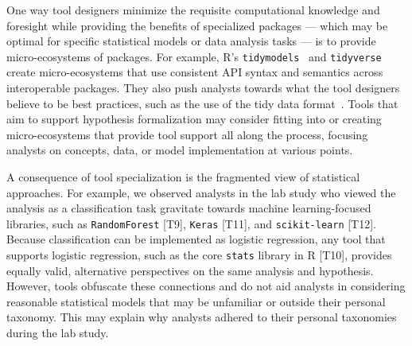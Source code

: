 
One way tool designers minimize the requisite computational knowledge and
foresight while providing the benefits of specialized packages --- which may be
optimal for specific statistical models or data analysis tasks --- is to provide
micro-ecosystems of packages. For example, R's
\texttt{tidymodels}~\cite{tidymodels} and \texttt{tidyverse}~\cite{tidyverse}
create micro-ecosystems that use consistent API syntax and semantics across
interoperable packages. They also push analysts towards what the tool designers
believe to be best practices, such as the use of the tidy data format~\cite{wickham2014tidy}. Tools
that aim to support hypothesis formalization may consider fitting into or
creating micro-ecosystems that provide tool support all along the process,
focusing analysts on concepts, data, or model implementation at various points. 

A consequence of tool specialization is the fragmented view of statistical
approaches. For example, we observed analysts in the lab study who viewed the
analysis as a classification task gravitate towards machine learning-focused
libraries, such as \texttt{RandomForest} [T9], \texttt{Keras} [T11], and
\texttt{scikit-learn} [T12]. Because classification can be implemented as
logistic regression, any tool that supports logistic regression, such as the
core \texttt{stats} library in R [T10], provides equally valid, alternative
perspectives on the same analysis and hypothesis. However, tools obfuscate these
connections and do not aid analysts in considering reasonable statistical models
that may be unfamiliar or outside their personal taxonomy. This may explain why
analysts adhered to their personal taxonomies during the lab study.

